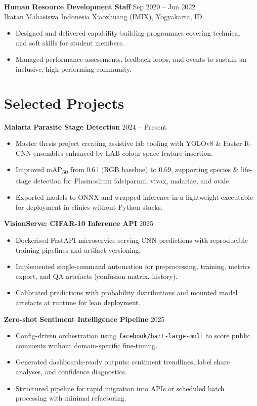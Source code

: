 \documentclass[11pt,a4paper]{article}
\begin{document}
\textbf{Human Resource Development Staff} \hfill Sep 2020 -- Jun 2022\\
Ikatan Mahasiswa Indonesia Xiaozhuang (IMIX), Yogyakarta, ID
\begin{itemize}
  \item Designed and delivered capability-building programmes covering technical and soft skills for student members.
  \item Managed performance assessments, feedback loops, and events to sustain an inclusive, high-performing community.
\end{itemize}

\section*{Selected Projects}
\textbf{Malaria Parasite Stage Detection} \hfill 2024 -- Present
\begin{itemize}
  \item Master thesis project creating assistive lab tooling with YOLOv8 \& Faster R-CNN ensembles enhanced by LAB colour-space feature insertion.
  \item Improved mAP\textsubscript{50} from 0.61 (RGB baseline) to 0.69, supporting species \& life-stage detection for Plasmodium falciparum, vivax, malariae, and ovale.
  \item Exported models to ONNX and wrapped inference in a lightweight executable for deployment in clinics without Python stacks.
\end{itemize}

\textbf{VisionServe: CIFAR-10 Inference API} \hfill 2025
\begin{itemize}
  \item Dockerised FastAPI microservice serving CNN predictions with reproducible training pipelines and artifact versioning.
  \item Implemented single-command automation for preprocessing, training, metrics export, and QA artefacts (confusion matrix, history).
  \item Calibrated predictions with probability distributions and mounted model artefacts at runtime for lean deployment.
\end{itemize}

\textbf{Zero-shot Sentiment Intelligence Pipeline} \hfill 2025
\begin{itemize}
  \item Config-driven orchestration using \texttt{facebook/bart-large-mnli} to score public comments without domain-specific fine-tuning.
  \item Generated dashboards-ready outputs: sentiment trendlines, label share analyses, and confidence diagnostics.
  \item Structured pipeline for rapid migration into APIs or scheduled batch processing with minimal refactoring.
\end{itemize}
\end{document}
